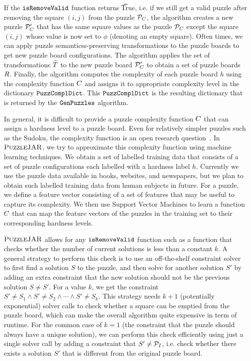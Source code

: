 If the $\texttt{isRemoveValid}$ function returns \t{True}, i.e. if we still
get a valid puzzle after removing the square $(i,j)$ from the puzzle
$\mathcal{P}_C$, the algorithm creates a new puzzle $\mathcal{P}_C'$
that has the same square values as the puzzle $\mathcal{P}_C$ except
the square $(i,j)$ whose value is now set to $\phi$ (denoting an empty
square). Often times, we can apply puzzle semanticss-preserving
transformations to the puzzle boards to get new puzzle board
configurations. The algorithm applies the set of transformations
$\widetilde{T}$ to the new puzzle board $\mathcal{P}_C'$ to
obtain a set of puzzle boards $R$. Finally, the algorithm
computes the complexity of each puzzle board $h$ using the complexity
function $C$ and assigns it to appropriate complexity
level in the dictionary $\texttt{PuzzComplDict}$. This $\texttt{PuzzComplDict}$ is
the resulting dictionary that is returned by the $\texttt{GenPuzzles}$
algorithm.

In general, it is difficult to provide a puzzle complexity function
$C$ that can assign a hardness level to a puzzle
board. Even for relatively simpler puzzles such as the Sudoku, the
complexity function is an open research
question~\cite{sudokuchaos}. In $\textsc{PuzzleJAR}$, we try to approximate
this complexity function using machine learning techniques. We obtain
a set of labelled training data that consists of a set of puzzle
configurations each labelled with a hardness label $h$. Currently we
use the puzzle data available in books, websites, and newspapers, but we plan to
obtain such labelled training data from human subjects in future. For
a puzzle, we define a feature vector consisting of a set of features
that may be useful to capture its complexity. We then use Support
Vector Machines to learn a function $C$ that can map
the feature vectors of the puzzles in the training set to their
corresponding hardness levels.

$\textsc{PuzzleJAR}$ allows for any $\texttt{isRemoveValid}$ function such as a
function that checks whether the number of current solutions is less
than a constant $k$. A general strategy to perform this check is to
use an off-the-shelf constraint solver to first find a solution $S$ to
the puzzle, and then solve for another solution $S'$ by adding an
extra constraint that the new solution should not be the previous
solution $S \neq S'$. For a value $k$, we get the constraint $S' \neq
S_1 \land S' \neq S_2 \land \cdots \land S' \neq S_k$. This strategy
needs $k+1$ (potentially exponential) solver calls to check whether a
square can be emptied from the puzzle board, which can make the
overall algorithm quite expensive in term of runtime. For the common case of $k=1$ (the
constraint that the puzzle should always have a unique solution), we
can perform this check efficiently using just a single solver call by
adding a constraint that $S' \neq \mathcal{P}_I$, i.e. check whether
there exists a solution $S'$ that is different from the original
puzzle board.
